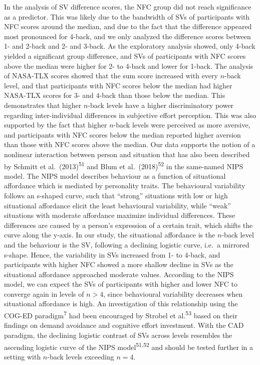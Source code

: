\documentclass[
  man,floatsintext]{apa6}
\begin{document}
In the analysis of SV difference scores, the NFC group did not reach significance as a predictor.
This was likely due to the bandwidth of SVs of participants with NFC scores around the median, and due to the fact that the difference appeared most pronounced for 4-back, and we only analyzed the difference scores between 1- and 2-back and 2- and 3-back.
As the exploratory analysis showed, only 4-back yielded a significant group difference, and SVs of participants with NFC scores above the median were higher for 2- to 4-back and lower for 1-back.
The analysis of NASA-TLX scores showed that the sum score increased with every \(n\)-back level, and that participants with NFC scores below the median had higher NASA-TLX scores for 3- and 4-back than those below the median.
This demonstrates that higher \(n\)-back levels have a higher discriminatory power regarding inter-individual differences in subjective effort perception.
This was also supported by the fact that higher \(n\)-back levels were perceived as more aversive, and participants with NFC scores below the median reported higher aversion than those with NFC scores above the median.
Our data supports the notion of a nonlinear interaction between person and situation that has also been described by Schmitt et al.~(2013)\textsuperscript{51} and Blum et al.~(2018)\textsuperscript{52} in the same-named NIPS model.
The NIPS model describes behaviour as a function of situational affordance which is mediated by personality traits.
The behavioural variability follows an s-shaped curve, such that ``strong'' situations with low or high situational affordance elicit the least behavioural variability, while ``weak'' situations with moderate affordance maximize individual differences.
These differences are caused by a person's expression of a certain trait, which shifts the curve along the y-axis.
In our study, the situational affordance is the \(n\)-back level and the behaviour is the SV, following a declining logistic curve, i.e.~a mirrored s-shape.
Hence, the variability in SVs increased from 1- to 4-back, and participants with higher NFC showed a more shallow decline in SVs as the situational affordance approached moderate values.
According to the NIPS model, we can expect the SVs of participants with higher and lower NFC to converge again in levels of \(n>4\), since behavioural variability decreases when situational affordance is high.
An investigation of this relationship using the COG-ED paradigm\textsuperscript{7} had been encouraged by Strobel et al.\textsuperscript{53} based on their findings on demand avoidance and cognitive effort investment.
With the CAD paradigm, the declining logistic contrast of SVs across levels resembles the ascending logistic curve of the NIPS model\textsuperscript{51,52} and should be tested further in a setting with \(n\)-back levels exceeding \(n=4\).
\end{document}
